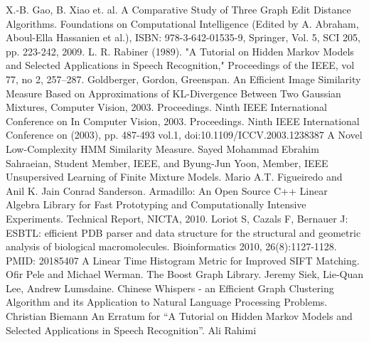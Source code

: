 \documentclass{DEarticle}
\begin{document}
\begin{thebibliography}{1}
 X.-B. Gao, B. Xiao et. al. A Comparative Study of Three Graph Edit Distance Algorithms. Foundations on Computational Intelligence (Edited by A. Abraham, Aboul-Ella Hassanien et al.), ISBN: 978-3-642-01535-9, Springer, Vol. 5, SCI 205, pp. 223-242, 2009. 
 L. R. Rabiner (1989). "A Tutorial on Hidden Markov Models and Selected Applications in Speech Recognition," Proceedings of the IEEE, vol 77, no 2, 257--287.
 Goldberger, Gordon, Greenspan. An Efficient Image Similarity Measure Based on Approximations of KL-Divergence Between Two Gaussian Mixtures, Computer Vision, 2003. Proceedings. Ninth IEEE International Conference on In Computer Vision, 2003. Proceedings. Ninth IEEE International Conference on (2003), pp. 487-493 vol.1, doi:10.1109/ICCV.2003.1238387 
 A Novel Low-Complexity HMM Similarity Measure. Sayed Mohammad Ebrahim Sahraeian, Student Member, IEEE, and Byung-Jun Yoon, Member, IEEE
 Unsupersived Learning of Finite Mixture Models. Mario A.T. Figueiredo and Anil K. Jain
 Conrad Sanderson. Armadillo: An Open Source C++ Linear Algebra Library for Fast Prototyping and Computationally Intensive Experiments. Technical Report, NICTA, 2010.
 Loriot S, Cazals F, Bernauer J: ESBTL: efficient PDB parser and data structure for the structural and geometric analysis of biological macromolecules. Bioinformatics 2010, 26(8):1127-1128. PMID: 20185407
 A Linear Time Histogram Metric for Improved SIFT Matching. Ofir Pele and Michael Werman. 
 The Boost Graph Library. Jeremy Siek, Lie-Quan Lee, Andrew Lumsdaine.
 Chinese Whispers - an Efficient Graph Clustering Algorithm and its Application to Natural Language
Processing Problems. Christian Biemann 
 An Erratum for ``A Tutorial on Hidden Markov Models and Selected Applications in Speech
Recognition''. Ali Rahimi 
\end{thebibliography}
\end{document}
